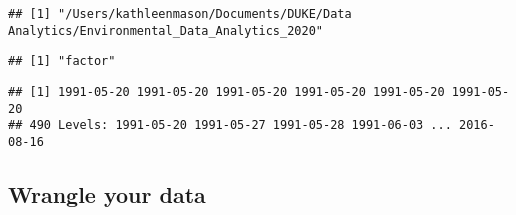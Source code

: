 \documentclass[]{article}
\newenvironment{Shaded}{\begin{snugshade}}{\end{snugshade}}
\newcommand{\CommentTok}[1]{\textcolor[rgb]{0.56,0.35,0.01}{\textit{#1}}}
\newcommand{\DataTypeTok}[1]{\textcolor[rgb]{0.13,0.29,0.53}{#1}}
\newcommand{\KeywordTok}[1]{\textcolor[rgb]{0.13,0.29,0.53}{\textbf{#1}}}
\newcommand{\NormalTok}[1]{#1}
\newcommand{\OperatorTok}[1]{\textcolor[rgb]{0.81,0.36,0.00}{\textbf{#1}}}
\newcommand{\StringTok}[1]{\textcolor[rgb]{0.31,0.60,0.02}{#1}}
\begin{document}
\begin{Shaded}
\end{Shaded}

\begin{verbatim}
## [1] "/Users/kathleenmason/Documents/DUKE/Data Analytics/Environmental_Data_Analytics_2020"
\end{verbatim}

\begin{Shaded}
\end{Shaded}

\begin{verbatim}
## [1] "factor"
\end{verbatim}

\begin{Shaded}
\end{Shaded}

\begin{verbatim}
## [1] 1991-05-20 1991-05-20 1991-05-20 1991-05-20 1991-05-20 1991-05-20
## 490 Levels: 1991-05-20 1991-05-27 1991-05-28 1991-06-03 ... 2016-08-16
\end{verbatim}

\hypertarget{wrangle-your-data}{%
\subsection{Wrangle your data}\label{wrangle-your-data}}
\end{document}
